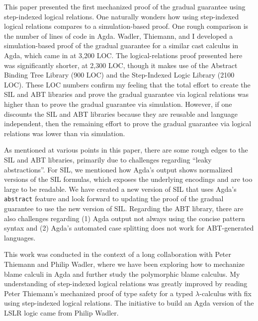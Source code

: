 \documentclass[submission,copyright,creativecommons]{eptcs}
\begin{document}
This paper presented the first mechanized proof of the gradual
guarantee using step-indexed logical relations. One naturally wonders
how using step-indexed logical relations compares to a
simulation-based proof. One rough comparison is the number of lines of
code in Agda. Wadler, Thiemann, and I developed a simulation-based
proof of the gradual guarantee for a similar cast calculus in Agda,
which came in at 3,200 LOC. The logical-relations proof presented here
was significantly shorter, at 2,300 LOC, though it makes use of the
Abstract Binding Tree Library (900 LOC) and the Step-Indexed Logic
Library (2100 LOC). These LOC numbers confirm my feeling that the
total effort to create the SIL and ABT libraries and prove the gradual
guarantee via logical relations was higher than to prove the gradual
guarantee via simulation. However, if one discounts the SIL and ABT
libraries because they are reusable and language independent, then the
remaining effort to prove the gradual guarantee via logical relations
was lower than via simulation.

As mentioned at various points in this paper, there are some rough
edges to the SIL and ABT libraries, primarily due to challenges
regarding ``leaky abstractions''. For SIL, we mentioned how Agda's
output shows normalized versions of the SIL formulas, which exposes
the underlying encodings and are too large to be readable. We have
created a new version of SIL that uses Agda's \texttt{abstract}
feature and look forward to updating the proof of the gradual
guarantee to use the new version of SIL. Regarding the ABT library,
there are also challenges regarding (1) Agda output not always using
the concise pattern syntax and (2) Agda's automated case splitting
does not work for ABT-generated languages.

This work was conducted in the context of a long collaboration with
Peter Thiemann and Philip Wadler, where we have been exploring how to
mechanize blame calculi in Agda and further study the polymorphic blame
calculus. My understanding of step-indexed logical relations was
greatly improved by reading Peter Thiemann's mechanized proof of type
safety for a typed $\lambda$-calculus with \textsf{fix} using
step-indexed logical relations. The initiative to build an Agda
version of the LSLR logic came from Philip Wadler.




\end{document}
